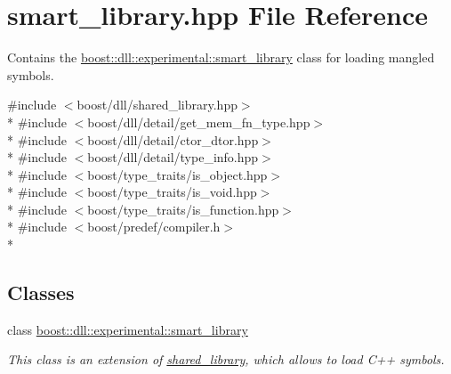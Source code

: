 \hypertarget{a00738}{}\section{smart\+\_\+library.\+hpp File Reference}
\label{a00738}


Contains the \hyperlink{a00281}{boost\+::dll\+::experimental\+::smart\+\_\+library} class for loading mangled symbols.  


{\ttfamily \#include $<$boost/dll/shared\+\_\+library.\+hpp$>$}\\*
{\ttfamily \#include $<$boost/dll/detail/get\+\_\+mem\+\_\+fn\+\_\+type.\+hpp$>$}\\*
{\ttfamily \#include $<$boost/dll/detail/ctor\+\_\+dtor.\+hpp$>$}\\*
{\ttfamily \#include $<$boost/dll/detail/type\+\_\+info.\+hpp$>$}\\*
{\ttfamily \#include $<$boost/type\+\_\+traits/is\+\_\+object.\+hpp$>$}\\*
{\ttfamily \#include $<$boost/type\+\_\+traits/is\+\_\+void.\+hpp$>$}\\*
{\ttfamily \#include $<$boost/type\+\_\+traits/is\+\_\+function.\+hpp$>$}\\*
{\ttfamily \#include $<$boost/predef/compiler.\+h$>$}\\*
\subsection*{Classes}
\begin{DoxyCompactItemize}
\item 
class \hyperlink{a00281}{boost\+::dll\+::experimental\+::smart\+\_\+library}
\begin{DoxyCompactList}\small\item\em This class is an extension of \hyperlink{a00271}{shared\+\_\+library}, which allows to load C++ symbols. \end{DoxyCompactList}\end{DoxyCompactItemize}
